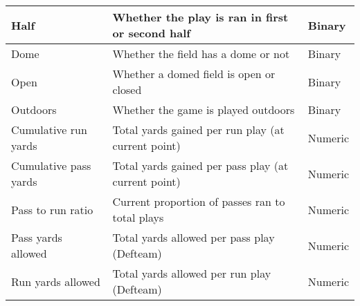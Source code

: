 \documentclass[11pt]{article}
\begin{document}
\begin{table*}[ht]
\begin{tabular}{|| m{4cm} | m{10cm}| m{2cm} ||}
                Half & Whether the play is ran in first or second half & Binary \\
                \hline 
                Dome & Whether the field has a dome or not & Binary \\
                \hline 
                Open & Whether a domed field is open or closed & Binary \\
                \hline 
                Outdoors & Whether the game is played outdoors & Binary \\
                \hline 
                Cumulative run yards & Total yards gained per run play (at current point) & Numeric  \\
                \hline 
                Cumulative pass yards & Total yards gained per pass play (at current point) & Numeric \\
                \hline
                Pass to run ratio & Current proportion of passes ran to total plays & Numeric \\
                \hline
                Pass yards allowed & Total yards allowed per pass play (Defteam) & Numeric \\
                \hline
                Run yards allowed & Total yards allowed per run play (Defteam) & Numeric \\
                \hline
            \end{tabular}
            \end{table*}
        
\end{document}
